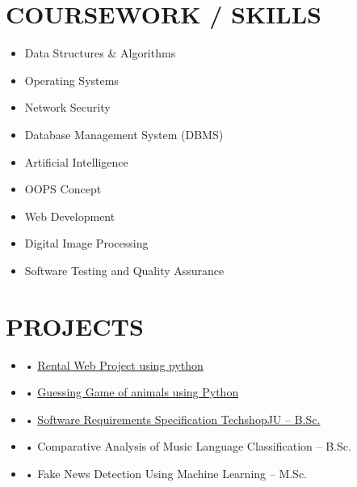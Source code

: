 \documentclass[letterpaper,11pt]{article}
\newcommand{\resumeItem}[1]{
  \item\small{
    {#1 \vspace{-2pt}}
  }
}
\newcommand{\resumeSubHeadingListStart}{\begin{itemize}[leftmargin=0.0in, label={}]}
\newcommand{\resumeSubHeadingListEnd}{\end{itemize}}
\begin{document}
\section{COURSEWORK / SKILLS}
\vspace{5pt}
        \begin{multicols}{4}
            \begin{itemize}[itemsep=-2pt, parsep=5pt]
                \item Data Structures \& Algorithms
                \item Operating Systems
                \item Network Security
                \item Database Management System (DBMS)
               \item Artificial Intelligence
                \item OOPS Concept
                \item Web Development
                \item Digital Image Processing
                \item Software Testing and Quality Assurance            \end{itemize}
        \end{multicols}
        \vspace*{4.0\multicolsep}






\vspace{-5pt}
\section{PROJECTS}
\vspace{5pt}
\resumeSubHeadingListStart

\resumeItem{• \href{https://github.com/himel2535/rental-web-project}{Rental Web Project using python}}
\resumeItem{• \href{https://github.com/himel2535/Guessing-game/tree/main}{Guessing Game of animals using Python}}
\resumeItem{• \href{https://github.com/himel2535/techshopJU}{Software Requirements Specification TechshopJU -- B.Sc.}}
\resumeItem{• Comparative Analysis of Music Language Classification -- B.Sc.}
\resumeItem{• Fake News Detection Using Machine Learning -- M.Sc.}

\resumeSubHeadingListEnd
\vspace{-12pt}
\end{document}
